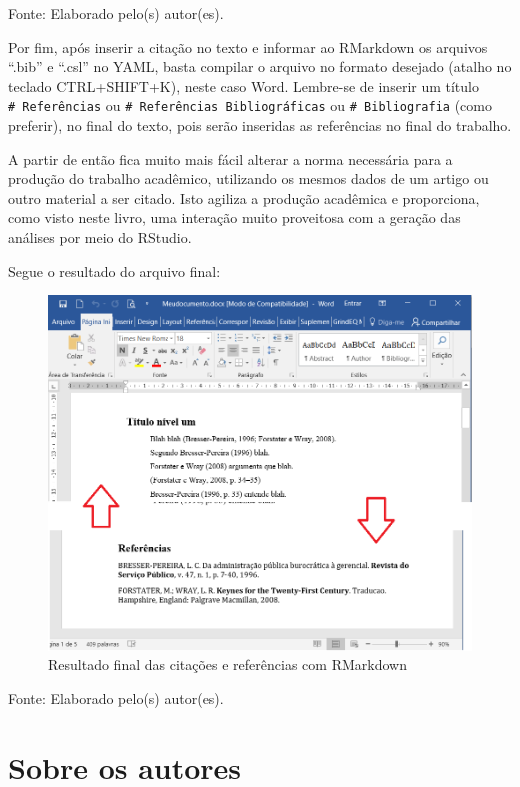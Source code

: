 \documentclass[12pt,brazil,oneside]{book}
\begin{document}
Fonte: Elaborado pelo(s) autor(es).

Por fim, após inserir a citação no texto e informar ao RMarkdown os
arquivos ``.bib'' e ``.csl'' no YAML, basta compilar o arquivo no
formato desejado (atalho no teclado CTRL+SHIFT+K), neste caso Word.
Lembre-se de inserir um título \texttt{\#\ Referências} ou
\texttt{\#\ Referências\ Bibliográficas} ou \texttt{\#\ Bibliografia}
(como preferir), no final do texto, pois serão inseridas as referências
no final do trabalho.

A partir de então fica muito mais fácil alterar a norma necessária para
a produção do trabalho acadêmico, utilizando os mesmos dados de um
artigo ou outro material a ser citado. Isto agiliza a produção acadêmica
e proporciona, como visto neste livro, uma interação muito proveitosa
com a geração das análises por meio do RStudio.

Segue o resultado do arquivo final:

\begin{figure}[H]

{\centering \includegraphics[width=0.8\linewidth]{rmarkcitarf} 

}

\caption{Resultado final das citações e referências com RMarkdown}\label{fig:rmarkcitarf}
\end{figure}

Fonte: Elaborado pelo(s) autor(es).

\hypertarget{sobre-os-autores}{%
\chapter*{Sobre os autores}\label{sobre-os-autores}}
\end{document}
